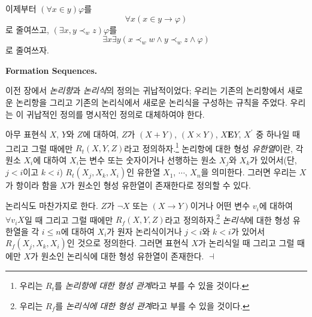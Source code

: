 \documentclass[12pt]{paper}
\newenvironment{context}[1][]
{ \noindent \textbf{{#1}.}
}
{ \hfill $ \dashv $
}
\begin{document}
  이제부터 $ \left( \forall x \in y \right) \varphi $를 $$ \forall x \left( x \in y \rightarrow \varphi \right) $$로 줄여쓰고,
  $ \left( \exists x , y \prec_{w} z \right) \varphi$를 $$ \exists x \exists y \left( x \prec_{w} w \land y \prec_{w} z \land \varphi \right) $$로 줄여쓰자.

  \begin{context}[Formation Sequences]
    이전 장에서 \textit{논리항}과 \textit{논리식}의 정의는 귀납적이었다;
    우리는 기존의 논리항에서 새로운 논리항을 그리고 기존의 논리식에서 새로운 논리식을 구성하는 규칙을 주었다.
    우리는 이 귀납적인 정의를 명시적인 정의로 대체하여야 한다.

    아무 표현식 $X$, $Y$와 $Z$에 대하여,
    $Z$가 $\left( X + Y \right)$, $\left( X \times Y \right)$, $X \mathbf{E} Y$, $X^{\prime}$ 중 하나일 때 그리고 그럴 때에만
    $R_t \left( X , Y , Z \right)$라고 정의하자.\footnote
    {
      우리는 $R_t$를 \textit{논리항에 대한 형성 관계}라고 부를 수 있을 것이다.
    }
    논리항에 대한 형성 \textit{유한열}이란, 각 원소 $X_{i}$에 대하여 $X_{i}$는 변수 또는 숫자이거나 선행하는 원소 $X_{j}$와 $X_{k}$가 있어서(단, $j < i$이고 $k < i$) $R_t \left( X_{j}, X_{k}, X_{i} \right)$인 유한열 $X_1$, $\cdots$, $X_n$을 의미한다.
    그러면 우리는 $X$가 항이라 함을 $X$가 원소인 형성 유한열이 존재한다로 정의할 수 있다.
    
    논리식도 마찬가지로 한다. $Z$가 $\lnot X$ 또는 $\left( X \to Y \right)$이거나 어떤 변수 $v_{i}$에 대하여 $\forall v_{i} X$일 때 그리고 그럴 때에만
    $R_f \left( X , Y , Z \right)$라고 정의하자.\footnote
    {
      우리는 $R_f$를 \textit{논리식에 대한 형성 관계}라고 부를 수 있을 것이다.
    }
    \textit{논리식}에 대한 형성 유한열을 각 $i \le n$에 대하여 $X_{i}$가 원자 논리식이거나 $j < i$와 $k < i$가 있어서 $R_f \left( X_{j} , X_{k} , X_{i} \right)$인 것으로 정의한다.
    그러면 표현식 $X$가 논리식일 때 그리고 그럴 때에만 $X$가 원소인 논리식에 대한 형성 유한열이 존재한다.
  \end{context}
\end{document}
